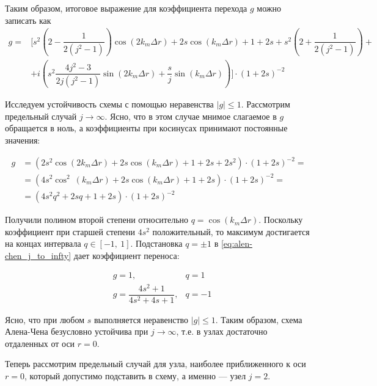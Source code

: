 Таким образом, итоговое выражение для коэффициента перехода $g$ можно записать как
	\begin{equation} \label{eq:alen-chen_g}
	\begin{split}
		g = &\biggl[ s^2 \left( 2 - \dfrac{1}{2(j^2 - 1)} \right) \cos{(2 k_m \Delta r)} + 2s \cos{(k_m \Delta r)} + 1 + 2s + s^2 \left( 2 + \dfrac{1}{2(j^2 - 1)} \right) + \\
		& + i \left( s^2 \dfrac{4j^2 - 3}{2j(j^2 - 1)} \sin{(2 k_m \Delta r)} + \dfrac{s}{j} \sin{(k_m \Delta r)}\right)
		 \biggr] \cdot (1+2s)^{-2} 
	\end{split}
	\end{equation}

Исследуем устойчивость схемы с помощью неравенства $|g| \le 1$. Рассмотрим предельный случай $j \to \infty$. Ясно, что в этом случае мнимое слагаемое в $g$ обращается в ноль, а коэффициенты при косинусах принимают постоянные значения:

\begin{equation} \label{eq:alen-chen_j_to_infty}
\begin{split}
	g &= \left( 2s^2 \cos{(2 k_m \Delta r)} + 2s \cos{(k_m \Delta r)} + 1 + 2s + 2s^2 \right) \cdot (1+2s)^{-2} = \\
	& = \left( 4s^2 \cos^2\ (k_m \Delta r) + 2s \cos{(k_m \Delta r)} + 1 + 2s \right) \cdot (1+2s)^{-2} = \\
	& = (4 s^2 q^2 + 2sq + 1 + 2s) \cdot (1+2s)^{-2}
\end{split}
\end{equation}

Получили полином второй степени относительно $q = \cos{(k_m \Delta r)}$. Поскольку коэффициент при старшей степени $4s^2$ положительный, то максимум достигается на концах интервала $q \in [-1,\ 1]$.  Подстановка $q = \pm 1$ в \eqref{eq:alen-chen_j_to_infty} дает коэффициент переноса:

\begin{align}
	& g = 1, &q = 1 \\
	& g = \dfrac{4s^2 + 1}{4s^2 + 4s + 1}, &q = -1
\end{align}

Ясно, что при любом $s$ выполняется неравенство $|g| \le 1$. Таким образом, схема Алена-Чена безусловно устойчива при $j \to \infty$, т.е. в узлах достаточно отдаленных от оси $r = 0$.


Теперь рассмотрим предельный случай для узла, наиболее приближенного к оси $r=0$, который допустимо подставить в схему, а именно — узел $j = 2$.

